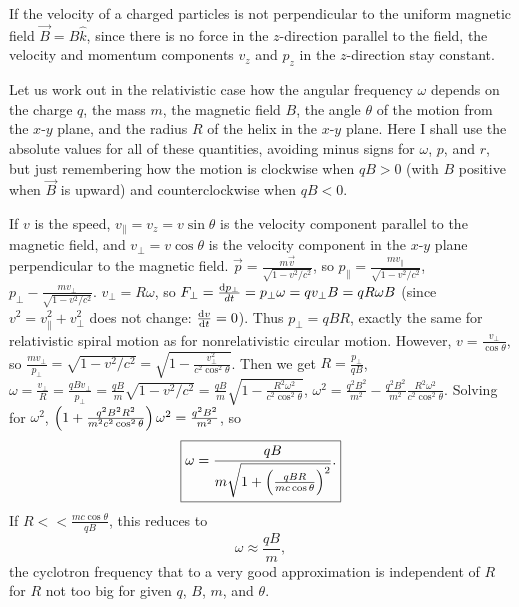 If the velocity of a charged particles is not perpendicular to the uniform magnetic field $\vec{B} = B\hat{k}$, since there is no force in the $z$-direction parallel to the field, the velocity and momentum components $v_z$ and $p_z$ in the $z$-direction stay constant.

Let us work out in the relativistic case how the angular frequency $\omega$ depends on the charge $q$, the mass $m$, the magnetic field $B$, the angle $\theta$ of the motion from the $x$-$y$ plane, and the radius $R$ of the helix in the $x$-$y$ plane. Here I shall use the absolute values for all of these quantities, avoiding minus signs for $\omega$, $p$, and $r$, but just remembering how the motion is clockwise when $qB > 0$ (with $B$ positive when $\vec{B}$ is upward) and counterclockwise when $qB < 0$.

If $v$ is the speed, $v_{\parallel} = v_z = v\sin\theta$ is the velocity component parallel to the magnetic field, and $v_\bot = v\cos\theta$ is the velocity component in the $x$-$y$ plane perpendicular to the magnetic field. $\vec{p} = \frac{m\vec{v}}{\sqrt{1-v^2/c^2}}$, so $p_\parallel = \frac{mv_\parallel}{\sqrt{1 - v^2/c^2}}$, $p_\bot - \frac{mv_\bot}{\sqrt{1-v^2/c^2}}$. $v_\bot = R\omega$, so $F_\bot = \frac{\operatorname{d\!} p_\bot}{dt} = p_\bot \omega = qv_\bot B = qR\omega B$ (since $v^2 = v_\parallel^2 + v_\bot^2$ does not change: $\frac{\operatorname{d\!} v}{\operatorname{d\!} t} = 0$). Thus $p_\bot = qBR$, exactly the same for relativistic spiral motion as for nonrelativistic circular motion. However, $v = \frac{v_\bot}{\cos\theta}$, so $\frac{mv_\bot}{p_\bot} = \sqrt{ 1 - v^2/c^2 } = \sqrt{ 1 - \frac{v_\bot^2}{c^2\cos^2\theta} }$. Then we get $R = \frac{p_\bot}{qB}$, $\omega = \frac{v_\bot}{R} = \frac{qBv_\bot}{p_\bot} = \frac{qB}{m}\sqrt{1 - v^2/c^2} = \frac{qB}{m}\sqrt{ 1 - \frac{R^2\omega^2}{c^2\cos^2\theta} }$, $\omega^2 = \frac{q^2B^2}{m^2} - \frac{q^2B^2}{m^2}\frac{R^2\omega^2}{c^2\cos^2\theta}$. Solving for $\omega^2$, $\left(  1 + \frac{q^2B^2R^2}{m^2c^2\cos^2\theta}  \right)\omega^2 = \frac{q^2B^2}{m^2}$, so
\begin{equation}
\boxed{ \omega = \dfrac{qB}{m\sqrt{ 1 + \left(\frac{qBR}{mc\cos\theta}\right)^2 }} . }
\end{equation}
If $R << \frac{mc\cos\theta}{qB}$, this reduces to
\begin{equation}
\omega \approx \dfrac{qB}{m},
\end{equation}
the cyclotron frequency that to a very good approximation is independent of $R$ for $R$ not too big for given $q$, $B$, $m$, and $\theta$.

